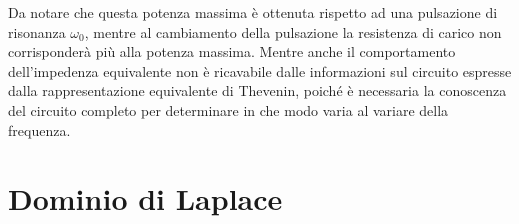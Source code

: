 \documentclass{article}
\numberwithin{equation}{subsection}
\begin{document}
Da notare che questa potenza massima è ottenuta rispetto ad una pulsazione di risonanza $\omega_0$, mentre al cambiamento della pulsazione la resistenza di carico non corrisponderà 
più alla potenza massima. Mentre anche il comportamento dell'impedenza equivalente non è ricavabile dalle informazioni sul circuito espresse dalla rappresentazione equivalente 
di Thevenin, poiché è necessaria la conoscenza del circuito completo per determinare in che modo varia al variare della frequenza. 

\clearpage

\clearpage

\section{Dominio di Laplace}
\end{document}
